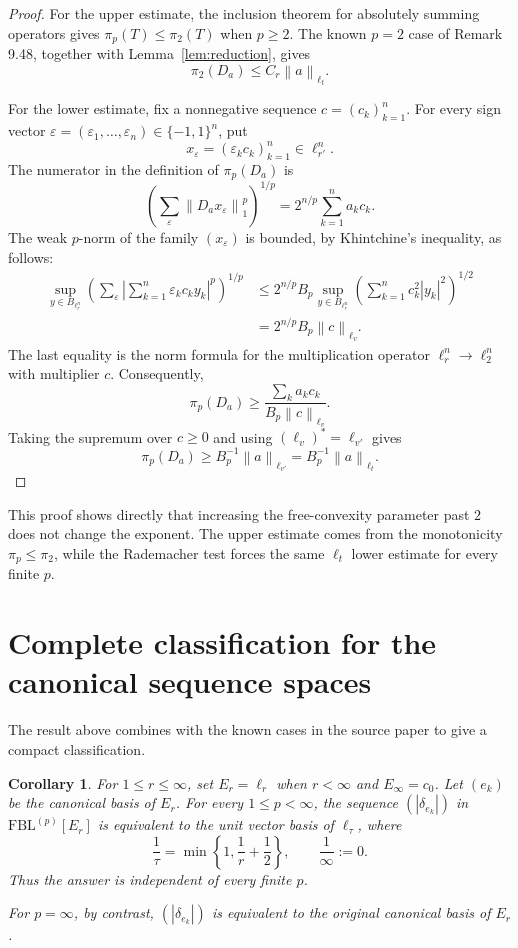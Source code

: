 \documentclass[11pt]{article}
\newtheorem{corollary}[theorem]{Corollary}
\theoremstyle{remark}
\newcommand{\FBL}{\mathrm{FBL}}
\newcommand{\norm}[1]{\left\lVert #1\right\rVert}
\newcommand{\abs}[1]{\left\lvert #1\right\rvert}
\newcommand{\eps}{\varepsilon}
\begin{document}
\begin{proof}
For the upper estimate, the inclusion theorem for absolutely summing
operators gives $\pi_p(T)\le\pi_2(T)$ when $p\ge2$.  The known $p=2$
case of Remark 9.48, together with Lemma~\ref{lem:reduction}, gives
\[
 \pi_2(D_a)\le C_r\norm{a}_{\ell_t}.
\]

For the lower estimate, fix a nonnegative sequence $c=(c_k)_{k=1}^n$.
For every sign vector $\eps=(\eps_1,\ldots,\eps_n)\in\{-1,1\}^n$, put
\[
 x_{\eps}=(\eps_kc_k)_{k=1}^n\in\ell_{r'}^n.
\]
The numerator in the definition of $\pi_p(D_a)$ is
\[
 \left(\sum_{\eps}\norm{D_ax_{\eps}}_1^p\right)^{1/p}
 =2^{n/p}\sum_{k=1}^n a_kc_k.
\]
The weak $p$-norm of the family $(x_{\eps})$ is bounded, by
Khintchine's inequality, as follows:
\begin{align*}
 \sup_{y\in B_{\ell_r^n}}
 \left(\sum_{\eps}
   \abs{\sum_{k=1}^n \eps_kc_ky_k}^{p}\right)^{1/p}
 &\le 2^{n/p}B_p
 \sup_{y\in B_{\ell_r^n}}
 \left(\sum_{k=1}^n c_k^2\abs{y_k}^2\right)^{1/2}\\
 &=2^{n/p}B_p\norm{c}_{\ell_v}.
\end{align*}
The last equality is the norm formula for the multiplication operator
$\ell_r^n\to\ell_2^n$ with multiplier $c$.  Consequently,
\[
 \pi_p(D_a)
 \ge \frac{\sum_k a_kc_k}{B_p\norm{c}_{\ell_v}}.
\]
Taking the supremum over $c\ge0$ and using $(\ell_v)^*=\ell_{v'}$
gives
\[
 \pi_p(D_a)\ge B_p^{-1}\norm{a}_{\ell_{v'}}
 =B_p^{-1}\norm{a}_{\ell_t}.
\]
\end{proof}

This proof shows directly that increasing the free-convexity parameter past
$2$ does not change the exponent.  The upper estimate comes from the
monotonicity $\pi_p\le\pi_2$, while the Rademacher test forces the same
$\ell_t$ lower estimate for every finite $p$.

\section{Complete classification for the canonical sequence spaces}

The result above combines with the known cases in the source paper to give
a compact classification.

\begin{corollary}
\label{cor:classification}
For $1\le r\le\infty$, set $E_r=\ell_r$ when $r<\infty$ and
$E_\infty=c_0$.  Let $(e_k)$ be the canonical basis of $E_r$.  For every
$1\le p<\infty$, the sequence $(\abs{\delta_{e_k}})$ in
$\FBL^{(p)}[E_r]$ is equivalent to the unit vector basis of $\ell_{\tau}$,
where
\[
 \frac1\tau=\min\left\{1,\frac1r+\frac12\right\},
 \qquad \frac1\infty:=0.
\]
Thus the answer is independent of every finite $p$.

For $p=\infty$, by contrast, $(\abs{\delta_{e_k}})$ is equivalent to the
original canonical basis of $E_r$.
\end{corollary}
\end{document}
